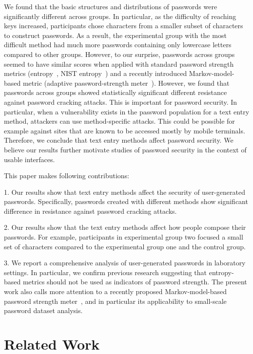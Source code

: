 \documentclass[conference]{IEEEtran}
\begin{document}
We found that the basic structures and distributions of passwords were significantly different across groups. In particular, as the difficulty of reaching keys increased, participants chose characters from a smaller subset of characters to construct passwords. As a result, the experimental group with the most difficult method had much more passwords containing only lowercase letters compared to other groups. However, to our surprise, passwords across groups seemed to have similar scores when applied with standard password strength metrics (entropy~\cite{Shannon:2001:MTC:584091.584093, 394764}, NIST entropy~\cite{Burr:2011:SEA:2206278}) and a recently introduced Markov-model-based metric (adaptive password-strength meter~\cite{Castelluccia:2012:NDSS:markov}). However,  we found that passwords across groups showed statistically significant different resistance against password cracking attacks. This is important for password security. In particular, when a vulnerability exists in the password population for a text entry method, attackers can use method-specific attacks. This could be possible for example against sites that are known to be accessed mostly by mobile terminals. Therefore, we conclude that text entry methods affect password security. We believe our results further motivate studies of password security in the context of usable interfaces.

This paper makes following contributions:


1. Our results show that text entry methods affect the security of user-generated passwords. Specifically, passwords created with different methods show significant difference in resistance against password cracking attacks.

2. Our results show that the text entry methods affect how people compose their passwords. For example, participants in experimental group two focused a small set of characters compared to the experimental group one and the control group.



3. We report a comprehensive analysis of user-generated passwords in laboratory settings. In particular, we confirm previous research suggesting that entropy-based metrics should not be used as indicators of password strength. The present work also calls more attention to a recently proposed Markov-model-based password strength meter~\cite{Castelluccia:2012:NDSS:markov}, and in particular its applicability to small-scale password dataset analysis.


\section{Related Work}
\end{document}
